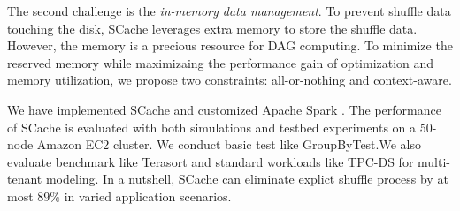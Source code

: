 The second challenge is the \textit{in-memory data management}. To prevent shuffle data touching the disk, SCache leverages extra memory to store the shuffle data. However, the memory is a precious resource for DAG computing. To minimize  the reserved memory while maximizaing the performance gain of optimization and memory utilization, we propose two constraints: all-or-nothing and context-aware. 

We have implemented SCache and customized Apache Spark \cite{apachespark}. The performance of SCache is evaluated with both simulations and testbed experiments on a 50-node Amazon EC2 cluster. We conduct basic test like GroupByTest.We also evaluate benchmark like Terasort \cite{spark-tera} and standard workloads like TPC-DS \cite{tpcds} for multi-tenant modeling. In a nutshell, SCache can eliminate explict shuffle process by at most $89\%$ in varied application scenarios.




